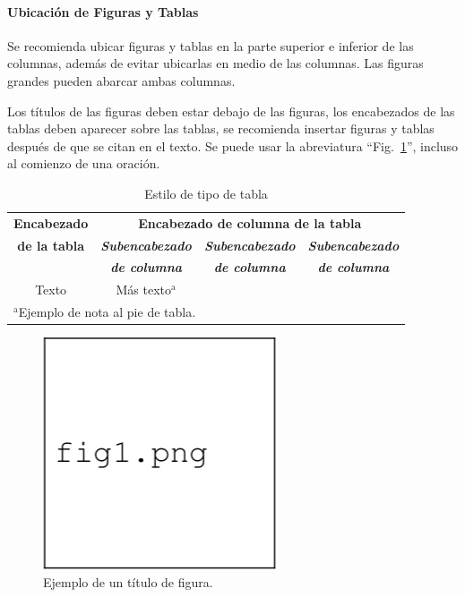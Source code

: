 \documentclass[letterpaper, 10pt, conference]{IEEEtran} %
\begin{document}
	\paragraph{Ubicación de Figuras y Tablas} Se recomienda ubicar figuras y tablas en la parte superior e inferior de las columnas, además de evitar ubicarlas en medio de las columnas. Las figuras grandes pueden abarcar ambas columnas.
	
	Los títulos de las figuras deben estar debajo de las figuras, los encabezados de las tablas deben aparecer sobre las tablas, se recomienda insertar figuras y tablas después de que se citan en el texto. Se puede usar la abreviatura ``Fig.~\ref{ejemploDeFigura}'', incluso al comienzo de una oración.
	
	\begin{table}[htbp]
		\caption{Estilo de tipo de tabla}
		\begin{center}
			\begin{tabular}{|c|c|c|c|}
				\hline
				\textbf{Encabezado} & \multicolumn{3}{|c|}{\textbf{Encabezado de columna de la tabla}} \\
				\cline{2-4}
				\textbf{de la tabla} & \textbf{\textit{Subencabezado}} & \textbf{\textit{Subencabezado}} & \textbf{\textit{Subencabezado}} \\
				 & \textbf{\textit{de columna}} & \textbf{\textit{de columna}} & \textbf{\textit{de columna}} \\
				\hline
				Texto & Más texto$^{\mathrm{a}}$ & & \\
				\hline
				\multicolumn{4}{l}{$^{\mathrm{a}}$Ejemplo de nota al pie de tabla.}
			\end{tabular}
			\label{ejemploDeTabla}
		\end{center}
	\end{table}
	
	\begin{figure}[htbp]
		\centerline{\includegraphics{Figuras/Figura1.png}}
		\caption{Ejemplo de un título de figura.}
		\label{ejemploDeFigura}
	\end{figure}
	
\end{document}
